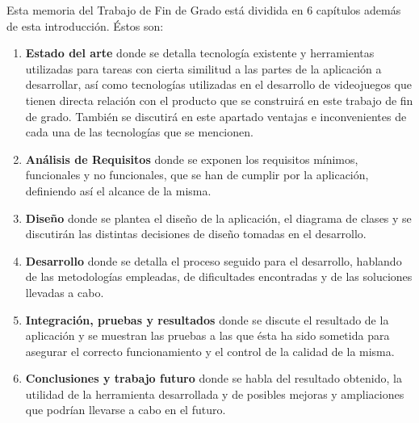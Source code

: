 Esta memoria del Trabajo de Fin de Grado está dividida en 6 capítulos además de esta introducción. Éstos son:

\begin{enumerate}
	\item \textbf{Estado del arte} donde se detalla tecnología existente y herramientas utilizadas para tareas con cierta similitud a las partes de la aplicación a desarrollar, así como tecnologías utilizadas en el desarrollo de videojuegos que tienen directa relación con el producto que se construirá en este trabajo de fin de grado. También se discutirá en este apartado ventajas e inconvenientes de cada una de las tecnologías que se mencionen.
	\item \textbf{Análisis de Requisitos} donde se exponen los requisitos mínimos, funcionales y no funcionales, que se han de cumplir por la aplicación, definiendo así el alcance de la misma.
	\item \textbf{Diseño} donde se plantea el diseño de la aplicación, el diagrama de clases y se discutirán las distintas decisiones de diseño tomadas en el desarrollo.
	\item \textbf{Desarrollo} donde se detalla el proceso seguido para el desarrollo, hablando de las metodologías empleadas, de dificultades encontradas y de las soluciones llevadas a cabo.
	\item \textbf{Integración, pruebas y resultados} donde se discute el resultado de la aplicación y se muestran las pruebas a las que ésta ha sido sometida para asegurar el correcto funcionamiento y el control de la calidad de la misma.
	\item \textbf{Conclusiones y trabajo futuro} donde se habla del resultado obtenido, la utilidad de la herramienta desarrollada y de posibles mejoras y ampliaciones que podrían llevarse a cabo en el futuro.
\end{enumerate}